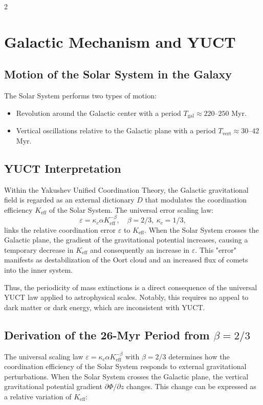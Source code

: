 \documentclass[11pt,a4paper]{article}
\begin{document}
\begin{multicols}{2}
		\section{Galactic Mechanism and YUCT}
		
		\subsection{Motion of the Solar System in the Galaxy}
		
		The Solar System performs two types of motion:
		\begin{itemize}
			\item Revolution around the Galactic center with a period \(T_{\text{gal}} \approx 220\)–\(250\) Myr.
			\item Vertical oscillations relative to the Galactic plane with a period \(T_{\text{vert}} \approx 30\)–\(42\) Myr.
		\end{itemize}
		
		\subsection{YUCT Interpretation}
		
		Within the Yakushev Unified Coordination Theory, the Galactic gravitational field is regarded as an external dictionary \(D\) that modulates the coordination efficiency \(K_{\mathrm{eff}}\) of the Solar System. The universal error scaling law:
		\[
		\varepsilon = \kappa_c \alpha K_{\mathrm{eff}}^{-\beta},\quad \beta = 2/3,\ \kappa_c = 1/3,
		\]
		links the relative coordination error \(\varepsilon\) to \(K_{\mathrm{eff}}\). When the Solar System crosses the Galactic plane, the gradient of the gravitational potential increases, causing a temporary decrease in \(K_{\mathrm{eff}}\) and consequently an increase in \(\varepsilon\). This "error" manifests as destabilization of the Oort cloud and an increased flux of comets into the inner system.
		
		Thus, the periodicity of mass extinctions is a direct consequence of the universal YUCT law applied to astrophysical scales. Notably, this requires no appeal to dark matter or dark energy, which are inconsistent with YUCT.
		
		\subsection{Derivation of the 26-Myr Period from $\beta = 2/3$}
		
		The universal scaling law $\varepsilon = \kappa_c \alpha K_{\mathrm{eff}}^{-\beta}$ with $\beta = 2/3$ determines how the coordination efficiency of the Solar System responds to external gravitational perturbations. When the Solar System crosses the Galactic plane, the vertical gravitational potential gradient $\partial \Phi / \partial z$ changes. This change can be expressed as a relative variation of $K_{\mathrm{eff}}$:
		

\end{multicols}
\end{document}
